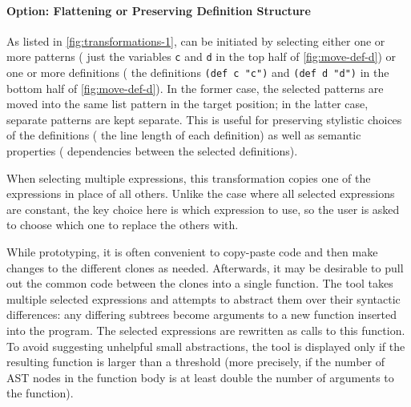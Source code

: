 \paragraph{Option: Flattening or Preserving Definition Structure}

As listed in \autoref{fig:transformations-1},  can be
initiated by selecting either one or more patterns (\eg{} just the
variables \verb+c+ and \verb+d+ in the top half of \autoref{fig:move-def-d})
or one or more
definitions (\eg{} the definitions \verb+(def c "c")+ and \verb+(def d "d")+
in the bottom half of \autoref{fig:move-def-d}).
In the former case, the selected patterns are moved into the
same list pattern in the target position; in the latter case, separate
patterns are kept separate. This is useful for preserving stylistic
choices of the definitions (\eg{} the line length of each definition)
as well as semantic properties (\eg{} dependencies between the
selected definitions).



When selecting multiple expressions, this transformation copies one of the
expressions in place of all others.  Unlike the case where all selected
expressions are constant, the key choice here is which expression to use, so the
user is asked to choose which one to replace the others with.



While prototyping, it is often convenient to copy-paste code and then
make changes to the different clones as needed. Afterwards, it may be
desirable to pull out the common code between the clones into a single function.
The 
tool takes multiple selected expressions and attempts to abstract them over their syntactic
differences: any differing subtrees become arguments to a new function inserted into the program.
The selected expressions are rewritten as calls to this function.
To avoid suggesting unhelpful small abstractions, the  tool is displayed only if
the resulting function is larger than a threshold (more precisely, if the number of AST nodes in the function
body is at least double the number of arguments to the function).



